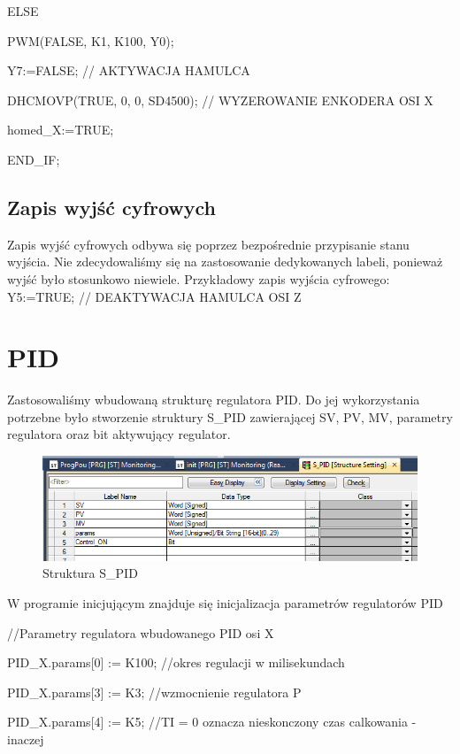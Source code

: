 \documentclass{mwrep}
\begin{document}
\quad ELSE

\quad PWM(FALSE, K1, K100, Y0);

\quad Y7:=FALSE; // AKTYWACJA HAMULCA

\quad DHCMOVP(TRUE, 0, 0, SD4500); // WYZEROWANIE ENKODERA OSI X

\quad homed\_X:=TRUE;

END\_IF;
 
\subsection{Zapis wyjść cyfrowych}
Zapis wyjść cyfrowych odbywa się poprzez bezpośrednie przypisanie stanu wyjścia. Nie zdecydowaliśmy się na zastosowanie dedykowanych labeli, ponieważ wyjść było stosunkowo niewiele.
	Przykładowy zapis wyjścia cyfrowego:
		Y5:=TRUE; // DEAKTYWACJA HAMULCA OSI Z


\section{PID}
\label{PLC::PID}

Zastosowaliśmy wbudowaną strukturę regulatora PID. Do jej wykorzystania potrzebne było stworzenie struktury S\_PID zawierającej SV, PV, MV, parametry regulatora oraz bit aktywujący regulator.

\begin{figure}[H]
    \label{PLC::Konfiguracja::HIOEN::WindowCH5}
    \centering
    \includegraphics[scale=0.5]{s_pid_struct.png}
    \caption{Struktura S\_PID}
\end{figure}


W programie inicjującym znajduje się inicjalizacja parametrów regulatorów PID 

//Parametry regulatora wbudowanego PID osi X

PID\_X.params[0] := K100; //okres regulacji w milisekundach

PID\_X.params[3] := K3; //wzmocnienie regulatora P

PID\_X.params[4] := K5; //TI = 0 oznacza nieskonczony czas calkowania - inaczej
\end{document}
